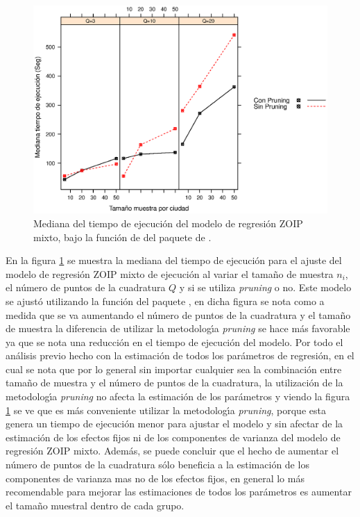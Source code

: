 \begin{figure}
	\begin{center}
		\includegraphics[scale=0.6]{time_mix_ZOIP.eps}	
		\caption{Mediana del tiempo de ejecuci\'{o}n del modelo de regresi\'{o}n ZOIP mixto, bajo la funci\'{o}n de  del paquete  de .}
		\label{time_mix_ZOIP}
	\end{center}
\end{figure}

En la figura \ref{time_mix_ZOIP} se muestra la mediana del tiempo de ejecuci\'{o}n para el ajuste del modelo de regresi\'{o}n ZOIP mixto de ejecuci\'{o}n al variar el tama\~{n}o de muestra $n_i$, el n\'{u}mero de puntos de la cuadratura $Q$ y si se utiliza \textit{pruning} o no. Este modelo se ajust\'{o} utilizando la funci\'{o}n  del paquete , en dicha figura se nota como a medida que se va aumentando el n\'{u}mero de puntos de la cuadratura y el tama\~{n}o de muestra la diferencia de utilizar la metodolog\'{\i}a \textit{pruning} se hace m\'{a}s favorable ya que se nota una reducci\'{o}n en el tiempo de ejecuci\'{o}n del modelo. Por todo el an\'{a}lisis previo hecho con la estimaci\'{o}n de todos los par\'{a}metros de regresi\'{o}n, en el cual se nota que por lo general sin importar cualquier sea la combinaci\'{o}n entre tama\~{n}o de muestra y el n\'{u}mero de puntos de la cuadratura, la utilizaci\'{o}n de la metodolog\'{\i}a \textit{pruning} no afecta la estimaci\'{o}n de los par\'{a}metros y viendo la figura \ref{time_mix_ZOIP} se ve que es m\'{a}s conveniente utilizar la metodolog\'{\i}a \textit{pruning}, porque esta genera un tiempo de ejecuci\'{o}n menor para ajustar el modelo y sin afectar de la estimaci\'{o}n de los efectos fijos ni de los componentes de varianza del modelo de regresi\'{o}n ZOIP mixto. Adem\'{a}s, se puede concluir que el hecho de aumentar el n\'{u}mero de puntos de la cuadratura s\'{o}lo beneficia a la estimaci\'{o}n de los componentes de varianza mas no de los efectos fijos, en general lo m\'{a}s recomendable para mejorar las estimaciones de todos los par\'{a}metros es aumentar el tama\~{n}o muestral dentro de cada grupo.


